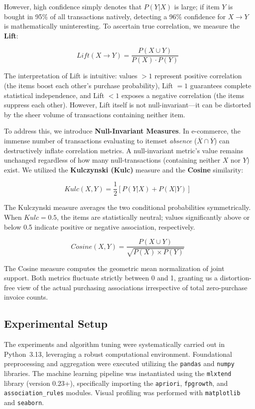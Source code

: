 \documentclass[conference]{IEEEtran}
\begin{document}
However, high confidence simply denotes that $P(Y|X)$ is large; if item $Y$ is bought in 95\% of all transactions natively, detecting a 96\% confidence for $X \rightarrow Y$ is mathematically uninteresting. To ascertain true correlation, we measure the \textbf{Lift}:

\begin{equation}
Lift(X \rightarrow Y) = \frac{P(X \cup Y)}{P(X) \cdot P(Y)}
\end{equation}

The interpretation of Lift is intuitive: values $>1$ represent positive correlation (the items boost each other's purchase probability), Lift $=1$ guarantees complete statistical independence, and Lift $<1$ exposes a negative correlation (the items suppress each other). However, Lift itself is not null-invariant---it can be distorted by the sheer volume of transactions containing neither item.

To address this, we introduce \textbf{Null-Invariant Measures}. In e-commerce, the immense number of transactions evaluating to itemset \textit{absence} ($\overline{X} \cap \overline{Y}$) can destructively inflate correlation metrics. A null-invariant metric's value remains unchanged regardless of how many null-transactions (containing neither $X$ nor $Y$) exist. We utilized the \textbf{Kulczynski (Kulc)} measure and the \textbf{Cosine} similarity:

\begin{equation}
Kulc(X, Y) = \frac{1}{2} \left[ P(Y|X) + P(X|Y) \right]
\end{equation}

The Kulczynski measure averages the two conditional probabilities symmetrically. When $Kulc = 0.5$, the items are statistically neutral; values significantly above or below 0.5 indicate positive or negative association, respectively.

\begin{equation}
Cosine(X, Y) = \frac{P(X \cup Y)}{\sqrt{P(X) \times P(Y)}}
\end{equation}

The Cosine measure computes the geometric mean normalization of joint support. Both metrics fluctuate strictly between 0 and 1, granting us a distortion-free view of the actual purchasing associations irrespective of total zero-purchase invoice counts.

\subsection{Experimental Setup}
The experiments and algorithm tuning were systematically carried out in Python~3.13, leveraging a robust computational environment. Foundational preprocessing and aggregation were executed utilizing the \texttt{pandas} and \texttt{numpy} libraries. The machine learning pipeline was instantiated using the \texttt{mlxtend} library (version 0.23+), specifically importing the \texttt{apriori}, \texttt{fpgrowth}, and \texttt{association\_rules} modules. Visual profiling was performed with \texttt{matplotlib} and \texttt{seaborn}.
\end{document}

